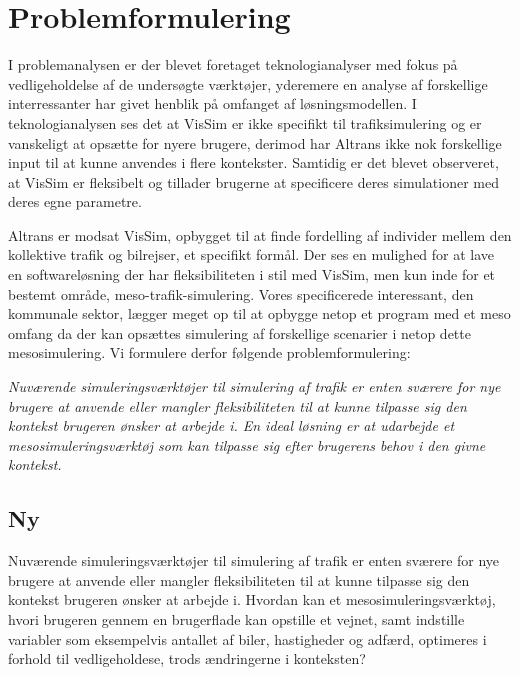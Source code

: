 \chapter{Problemformulering}\label{Problemformulering}

I problemanalysen er der blevet foretaget teknologianalyser med fokus på vedligeholdelse af de undersøgte værktøjer, yderemere en analyse af forskellige interressanter har givet henblik på omfanget af løsningsmodellen. I teknologianalysen ses det at VisSim er ikke specifikt til trafiksimulering og er vanskeligt at opsætte for nyere brugere, derimod har Altrans ikke nok forskellige input til at kunne anvendes i flere kontekster. Samtidig er det blevet observeret, at VisSim er fleksibelt og tillader brugerne at specificere deres simulationer med deres egne parametre.

\vspace{5mm}

Altrans er modsat VisSim, opbygget til at finde fordelling af individer mellem den kollektive trafik og bilrejser, et specifikt formål. Der ses en mulighed for at lave en softwareløsning der har fleksibiliteten i stil med VisSim, men kun inde for et bestemt område, meso-trafik-simulering. Vores specificerede interessant, den kommunale sektor, lægger meget op til at opbygge netop et program med et meso omfang da der kan opsættes simulering af forskellige scenarier i netop dette mesosimulering. Vi formulere derfor følgende problemformulering:

\vspace{5mm}

\begin{center}
\textit{Nuværende simuleringsværktøjer til simulering af trafik er enten sværere for nye brugere at anvende eller mangler fleksibiliteten til at kunne tilpasse sig den kontekst brugeren ønsker at arbejde i. En ideal løsning er at udarbejde et mesosimuleringsværktøj som kan tilpasse sig efter brugerens behov i den givne kontekst.}
\end{center}

\section{Ny}
Nuværende simuleringsværktøjer til simulering af trafik er enten sværere for nye brugere at anvende eller mangler fleksibiliteten til at kunne tilpasse sig den kontekst brugeren ønsker at arbejde i. Hvordan kan et mesosimuleringsværktøj, hvori brugeren gennem en brugerflade kan opstille et vejnet, samt indstille variabler som eksempelvis antallet af biler, hastigheder og adfærd, optimeres i forhold til vedligeholdese, trods ændringerne i konteksten?